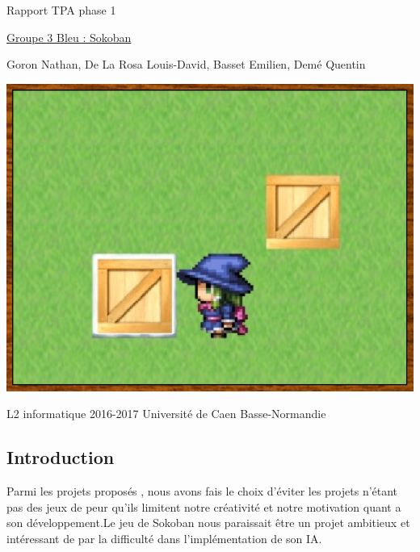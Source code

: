 \documentclass{article}
\begin{document}
\begin{titlepage}
\begin{center}
\Huge Rapport TPA phase 1

\normalsize
\vspace{0.5cm}
\Large {\underline{ Groupe 3 Bleu : Sokoban} }

\vspace{1cm}

\normalsize
Goron Nathan, De La Rosa Louis-David, Basset Emilien, Demé Quentin

\vspace{1cm}
\begin{center}
\includegraphics[scale=0.7]{../Screenshots/main.jpg}
\end{center}
\vspace{3.5cm}
L2 informatique 2016-2017 Université de Caen Basse-Normandie
\end{center}
\end{titlepage}


\newpage
\tableofcontents

\newpage
\begin{center}
	\section{Introduction}
\end{center}
\vspace{1cm}
	Parmi les projets proposés , nous avons fais le choix d'éviter les projets n'étant pas des jeux de peur qu'ils limitent notre créativité et notre motivation quant a son développement.Le jeu de Sokoban nous paraissait être un projet ambitieux et intéressant de par la difficulté dans l'implémentation de son IA.
 \vspace{0.5cm}
\end{document}
